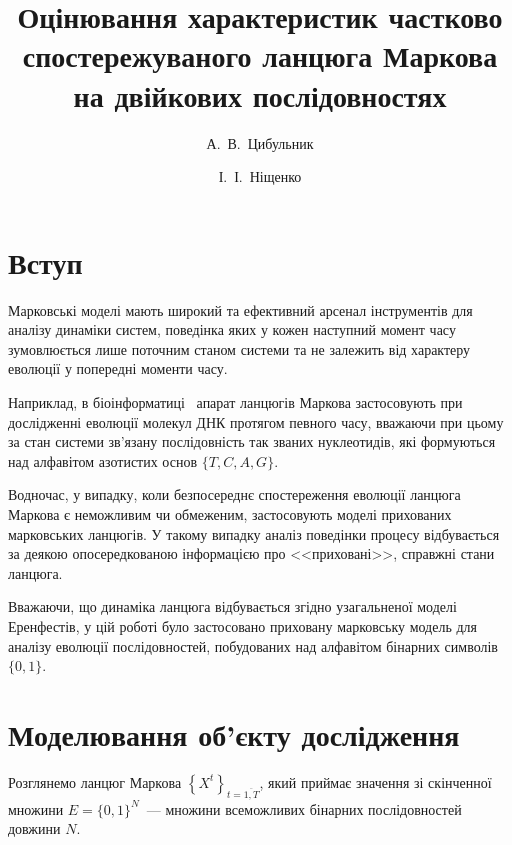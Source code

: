 \documentclass[]{iptconf}
\title{Оцінювання характеристик частково спостережуваного ланцюга Маркова на двійкових послідовностях}
\author[anton.tsybulnik@gmail.com]{А.~В.~Цибульник}{1}
\author{І.~І.~Ніщенко}{1}
\affiliation{\ipt}{1}
\theoremstyle{plain}
\begin{document}


\section*{Вступ}

Марковські моделі мають широкий та ефективний арсенал інструментів для аналізу динаміки систем, поведінка яких у кожен наступний момент часу зумовлюється лише поточним станом системи та не залежить від характеру еволюції у попередні моменти часу. 

Наприклад, в біоінформатиці~\cite[глава 9]{Koski2001} апарат ланцюгів Маркова застосовують при дослідженні еволюції молекул ДНК протягом певного часу, вважаючи при цьому за стан системи зв'язану послідовність так званих нуклеотидів, які формуються над алфавітом азотистих основ $\{ T,C,A,G \}$.  

Водночас, у випадку, коли безпосереднє спостереження еволюції ланцюга Маркова є неможливим чи обмеженим, застосовують моделі прихованих марковських ланцюгів. У такому випадку аналіз поведінки процесу відбувається за деякою опосередкованою інформацією про <<приховані>>, справжні стани ланцюга. 

Вважаючи, що динаміка ланцюга відбувається згідно узагальненої моделі Еренфестів, у цій роботі було застосовано приховану марковську модель для аналізу еволюції послідовностей, побудованих над алфавітом бінарних символів $\{ 0,1 \}$.

\section{Моделювання об'єкту дослідження}
\setcounter{equation}{0}

Розглянемо ланцюг Маркова $\left\{ X^t \right\}_{t=\overline{1,T}}$, який приймає значення зі скінченної множини $E=\{0,1\}^N$~--- множини всеможливих бінарних послідовностей довжини $N$.
\end{document}
